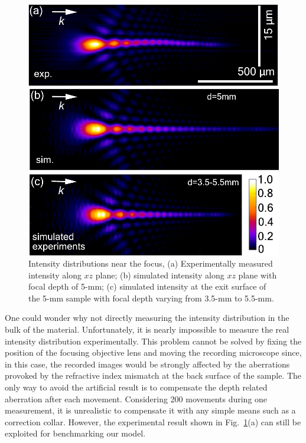 \documentclass[9pt,twocolumn,twoside]{osajnl}
\begin{document}
\begin{figure}[t]
	\centering
	\includegraphics[width=\linewidth]{50xSi.pdf}
	\caption{Intensity distributions near the focus, (a) Experimentally measured intensity along $xz$ plane; (b) simulated intensity along $xz$ plane with focal depth of 5-mm; (c) simulated intensity at the exit surface of the 5-mm sample with focal depth varying from 3.5-mm to 5.5-mm.}\label{fig:5}
\end{figure}

One could wonder why not directly measuring the intensity distribution in the bulk of the material. Unfortunately, it is nearly impossible to measure the real intensity distribution experimentally. This problem cannot be solved by fixing the position of the focusing objective lens and moving the recording microscope since, in this case, the recorded images would be strongly affected by the aberrations provoked by the refractive index mismatch at the back surface of the sample. %
The only way to avoid the artificial result is to compensate the depth related aberration after each movement. Considering 200 movements during one measurement, it is unrealistic to compensate it with any simple means such as a correction collar. However, the experimental result shown in Fig.~\ref{fig:5}(a) can still be exploited for benchmarking our model.
\end{document}
